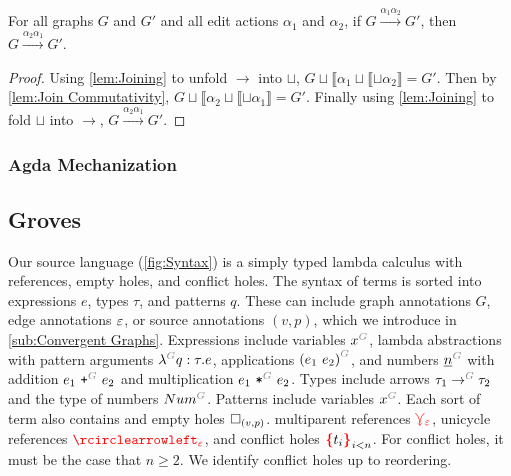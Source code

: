 \begin{theorem}[Commutativity]
  \label{thm:Commutativity}
  For all graphs $G$ and $G'$ and all edit actions $\alpha_1$ and $\alpha_2$,
  if $G \overset{\alpha_1\alpha_2}{\longrightarrow} G'$,
  then $G \overset{\alpha_2\alpha_1}{\longrightarrow} G'$.
\end{theorem}
\begin{proof}
  Using \autoref{lem:Joining} to unfold $\rightarrow$ into $\sqcup$,
  $G \sqcup \llbracket\alpha_1 \sqcup \llbracket \sqcup \alpha_2 \rrbracket = G'$.
  Then by \autoref{lem:Join Commutativity},
  $G \sqcup \llbracket\alpha_2 \sqcup \llbracket \sqcup \alpha_1 \rrbracket = G'$.
  Finally using \autoref{lem:Joining} to fold $\sqcup$ into $\rightarrow$,
  $G \overset{\alpha_2\alpha_1}{\longrightarrow} G'$.
\end{proof}

\subsubsection{Agda Mechanization}%
\label{sub:Agda Mechanization}

\subsection{Groves}%
\label{sub:Groves}

\figureTermSyntax{}


Our source language (\autoref{fig:Syntax}) is a simply typed lambda calculus with references, empty holes, and conflict holes.
The syntax of terms is sorted into
  expressions $e$,
  types $\tau$,
  and patterns $q$.
These can include
  graph annotations $G$,
  edge annotations $\varepsilon$,
  or source annotations $(v, p)$,
  which we introduce in \autoref{sub:Convergent Graphs}.
Expressions include
  variables $\eVar{G}{x}$,
  lambda abstractions with pattern arguments $\eFun{G}{q}{\tau}{e}$,
  applications $\eApp{G}{e_1}{e_2}$,
  and numbers $\eNum{G}{n}$ with addition $\ePlus{G}{e_1}{e_2}$ and multiplication $\eTimes{G}{e_1}{e_2}$.
Types include
  arrows $\tArrow{G}{\tau_1}{\tau_2}$
  and the type of numbers $\tNum{G}$.
Patterns include variables $\pVar{G}{x}$.
Each sort of term also contains
and empty holes $\square_{(v, p)}$.
multiparent references $\textcolor{red}{\curlyveedownarrow_{\varepsilon}}$,
unicycle references $\cycleVertex{\e}$,
and conflict holes $\conflictHole{t_i}_{i < n}$.
For conflict holes, it must be the case that $n \geq 2$.
We identify conflict holes up to reordering.

